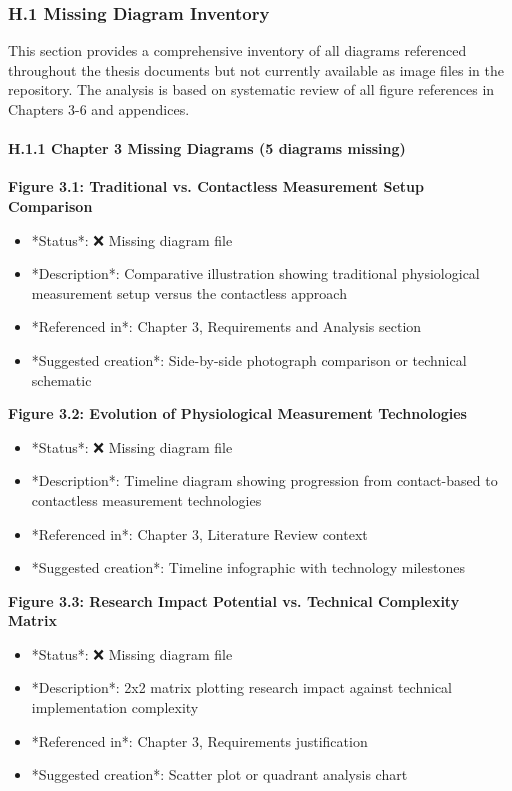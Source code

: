 \documentclass[12pt,a4paper]{article}
\begin{document}
{{\subsubsection{H.1 Missing Diagram Inventory}

This section provides a comprehensive inventory of all diagrams referenced throughout the thesis documents but not
currently available as image files in the repository. The analysis is based on systematic review of all figure
references in Chapters 3-6 and appendices.

\paragraph{H.1.1 Chapter 3 Missing Diagrams (5 diagrams missing)}

\textbf{Figure 3.1: Traditional vs. Contactless Measurement Setup Comparison}

\begin{itemize}
\item *Status*: ❌ Missing diagram file
\item *Description*: Comparative illustration showing traditional physiological measurement setup versus the contactless
  approach
\item *Referenced in*: Chapter 3, Requirements and Analysis section
\item *Suggested creation*: Side-by-side photograph comparison or technical schematic

\end{itemize}
\textbf{Figure 3.2: Evolution of Physiological Measurement Technologies}

\begin{itemize}
\item *Status*: ❌ Missing diagram file
\item *Description*: Timeline diagram showing progression from contact-based to contactless measurement technologies
\item *Referenced in*: Chapter 3, Literature Review context
\item *Suggested creation*: Timeline infographic with technology milestones

\end{itemize}
\textbf{Figure 3.3: Research Impact Potential vs. Technical Complexity Matrix}

\begin{itemize}
\item *Status*: ❌ Missing diagram file
\item *Description*: 2x2 matrix plotting research impact against technical implementation complexity
\item *Referenced in*: Chapter 3, Requirements justification
\item *Suggested creation*: Scatter plot or quadrant analysis chart


\end{itemize}}}
\end{document}
